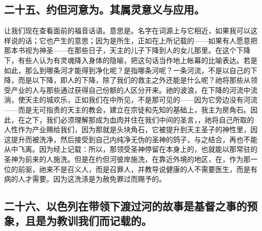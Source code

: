 
\subsection{二十五、约但河意为。其属灵意义与应用。}

让我们现在查看面前的福音话语。意思是。名字在词源上与它相近，如果我可以这样说的话；它也产生的意思；因为是所生，正如在上所记载的——如果有人愿意把那本书视为神圣——在那些日子，天主的儿子下降到人的女儿那里。在这个下降下，有些人认为有灵魂降入身体的隐喻，把这句话当作地上帐幕的比喻表达。若是如此，那么到哪条河才能得到净化呢？是指哪条河呢？一条河流，不是以自己的下降，而是以下降，即人的下降，除了我们的救主之外还能是什么呢？祂将那些从领受产业的人与那些通过获得自己份额的人区分开来。祂的波浪，在下降的河流中流淌，使天主的城欢乐，正如我们在中所见，不是那可见的——因为它旁边没有河流——而是无可指责的天主的教会，建立在宗徒和先知的基础上，我主为房角石。因此，在之下，我们必须理解那成为血肉并住在我们中间的圣言，，祂将自己所取的人性作为产业赐给我们，因为那就是头块角石，它被提升到天主圣子的神性里，因这提升而被洗净，然后接受到自己内纯净无伪的圣神的鸽子，与之结合，再也不能从中飞离。因为经上记载：所以，那领受圣神停留在本身上的，也就能以那常驻的圣神为前来的人施洗。但是在约但河彼岸施洗，在靠近外境的地区，在，作为那一位的前驱，祂来不是召义人，而是召罪人，并教导说健康的人不需要医生，而是有病的人才需要。因为这洗涤是为赦免罪过而赐予的。\par


\subsection{二十六、以色列在带领下渡过河的故事是基督之事的预象，且是为教训我们而记载的。}

